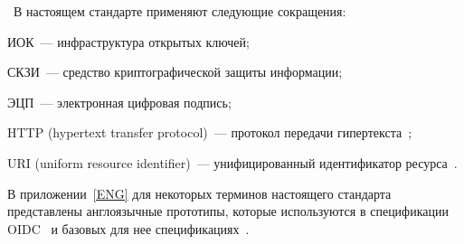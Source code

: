 
\thesection~В настоящем стандарте применяют следующие сокращения:

ИОК~--- инфраструктура открытых ключей;

СКЗИ~--- средство криптографической защиты информации;

ЭЦП~--- электронная цифровая подпись;

HTTP (hypertext transfer protocol)~--- протокол передачи 
гипертекста~\cite{RFC3986};

URI (uniform resource identifier)~--- унифицированный идентификатор 
ресурса~\cite{RFC3986}.

В приложении~\ref{ENG} для некоторых терминов настоящего стандарта представлены
англоязычные прототипы, которые используются в спецификации OIDC~\cite{OIDC} и
базовых для нее спецификациях~\cite{RFC6749,RFC6750}.


